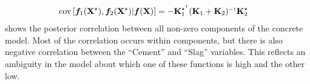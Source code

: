 %
%
\begin{align}
\covargs{ \vf_1(\vX^\star)}{\vf_2(\vX^\star) | \vf(\vX) } 
& = - \vK_1^{\star\tra} (\vK_1 + \vK_2)\inv \vK_2^\star
\label{eq:post-component-cov}
\end{align}
%
 shows the posterior correlation between all non-zero components of the concrete model.
Most of the correlation occurs within components, but there is also negative correlation between the ``Cement'' and ``Slag'' variables.
This reflects an ambiguity in the model about which one of these functions is high and the other low.











